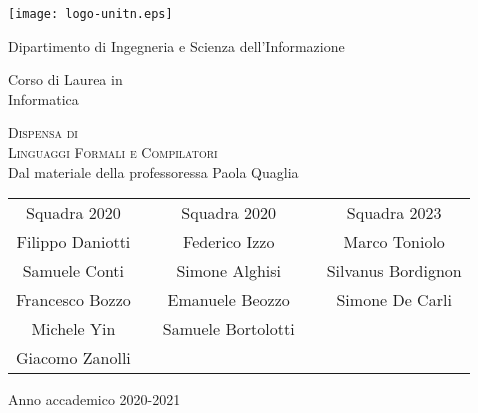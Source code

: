 \documentclass[class=book, crop=false, oneside]{standalone}
\begin{document}
\begin{titlepage}
	\centering
	\texttt{[image: logo-unitn.eps]}

	\vspace{1.3cm}
	\LARGE{Dipartimento di Ingegneria e Scienza dell'Informazione\\}

	\vspace{.9cm}
	\Large{Corso di Laurea in\\ Informatica}

	\vspace{.9cm}
	\Huge\textsc{Dispensa di\\Linguaggi Formali e Compilatori\\}
	\vspace{.2cm}
	\large{Dal materiale della professoressa Paola Quaglia}

	\vspace{1.8cm}
	\begin{tabularx}{\textwidth}{cXcXc}
		\Large{Squadra 2020} && \Large{Squadra 2020} && \Large{Squadra 2023} \\
		\cmidrule(lr){1-1} \cmidrule(lr){3-3} \cmidrule(lr){5-5}
		\large{Filippo Daniotti} && \large{Federico Izzo} && \large{Marco Toniolo}  \\
		\large{Samuele Conti} && \large{Simone Alghisi} && \large{Silvanus Bordignon} \\
		\large{Francesco Bozzo} && \large{Emanuele Beozzo} && \large{Simone De Carli} \\
		\large{Michele Yin} && \large{Samuele Bortolotti} && \\
		\large{Giacomo Zanolli} && && \\
	\end{tabularx}

	\vspace{1.4cm}
	\LARGE{Anno accademico 2020-2021}
\end{titlepage}
\end{document}

